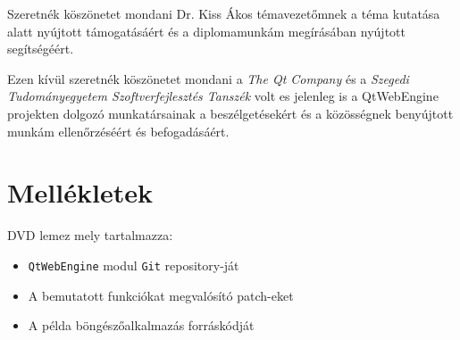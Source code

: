 \documentclass[12pt]{report}
\begin{document}
\noindent
Szeretnék köszönetet mondani Dr. Kiss Ákos témavezetőmnek a téma kutatása alatt nyújtott
támogatásáért és a diplomamunkám megírásában nyújtott segítségéért.

Ezen kívül szeretnék köszönetet mondani a \textit{The Qt Company} és a
\textit{Szegedi Tudományegyetem Szoftverfejlesztés Tanszék} volt es jelenleg is a QtWebEngine
projekten dolgozó munkatársainak a beszélgetésekért és a közösségnek benyújtott munkám
ellenőrzéséért és befogadásáért.


\chapter*{Mellékletek}

\noindent
DVD lemez mely tartalmazza:
\begin{itemize}
    \item \texttt{QtWebEngine} modul \texttt{Git} repository-ját
    \item A bemutatott funkciókat megvalósító patch-eket
    \item A példa böngészőalkalmazás forráskódját
\end{itemize}
\end{document}
